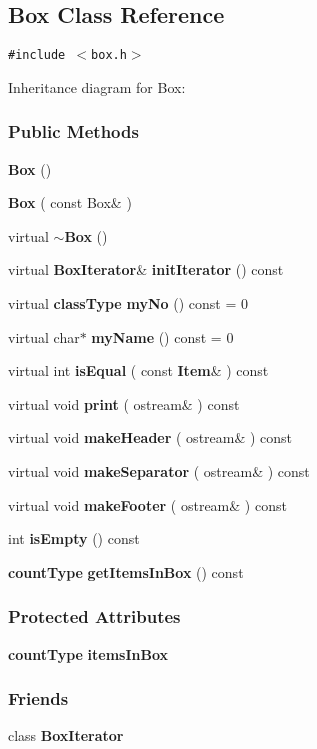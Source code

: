 \subsection{Box  Class Reference}
\label{Box}
{\tt \#include $<$box.h$>$}

Inheritance diagram for Box:\begin{figure}[H]
\begin{center}
\leavevmode
\setlength{\epsfysize}{6cm}
\end{center}
\end{figure}
\subsubsection*{Public Methods}
\begin{CompactItemize}
\item 
{\bf Box} ()
\item 
{\bf Box} ( const Box\& )
\item 
virtual {\bf $\sim$Box} ()
\item 
virtual {\bf Box\-Iterator}\& {\bf init\-Iterator} () const
\item 
virtual {\bf class\-Type} {\bf my\-No} () const = 0
\item 
virtual char$\ast$ {\bf my\-Name} () const = 0
\item 
virtual int {\bf is\-Equal} ( const {\bf Item}\& ) const
\item 
virtual void {\bf print} ( ostream\& ) const
\item 
virtual void {\bf make\-Header} ( ostream\& ) const
\item 
virtual void {\bf make\-Separator} ( ostream\& ) const
\item 
virtual void {\bf make\-Footer} ( ostream\& ) const
\item 
int {\bf is\-Empty} () const
\item 
{\bf count\-Type} {\bf get\-Items\-In\-Box} () const
\end{CompactItemize}
\subsubsection*{Protected Attributes}
\begin{CompactItemize}
\item 
{\bf count\-Type} {\bf items\-In\-Box}
\end{CompactItemize}
\subsubsection*{Friends}
\begin{CompactItemize}
\item 
class {\bf Box\-Iterator}
\end{CompactItemize}


